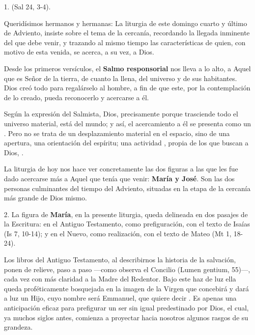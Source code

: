 				\begin{body}
					1.  (Sal 24, 3-4). 
					
					Queridísimos hermanos y hermanas: La liturgia de este domingo cuarto y último de Adviento, insiste sobre el tema de la cercanía, recordando la llegada inminente del que debe venir, y trazando al mismo tiempo las características de quien, con motivo de esta venida, se acerca, a su vez, a Dios.
					
					Desde los primeros versículos, el \textbf{Salmo responsorial} nos lleva a lo alto, a Aquel que es Señor de la tierra, de cuanto la llena, del universo y de sus habitantes. Dios creó todo para regalárselo al hombre, a fin de que este, por la contemplación de lo creado, pueda reconocerlo y acercarse a él.
					
					Según la expresión del Salmista, Dios, precisamente porque trasciende todo el universo material, está  del mundo; y así, el acercamiento a él se presenta como un . Pero no se trata de un desplazamiento material en el espacio, sino de una apertura, una orientación del espíritu; una actividad , propia de los que buscan a Dios, .
					
					La liturgia de hoy nos hace ver concretamente las dos figuras a las que les fue dado acercarse más a Aquel que tenía que venir: \textbf{María y José}. Son las dos personas culminantes del tiempo del Adviento, situadas en la etapa de la cercanía más grande de Dios mismo.
					
					2. La figura de \textbf{María}, en la presente liturgia, queda delineada en dos pasajes de la Escritura: en el Antiguo Testamento, como prefiguración, con el texto de Isaías (Is 7, 10-14); y en el Nuevo, como realización, con el texto de Mateo (Mt 1, 18-24).
					
					Los libros del Antiguo Testamento, al describirnos la historia de la salvación, ponen de relieve, paso a paso ---como observa el Concilio (Lumen gentium, 55)---, cada vez con más claridad a la Madre del Redentor. Bajo este haz de luz ella queda proféticamente bosquejada en la imagen de la Virgen que concebirá y dará a luz un Hijo, cuyo nombre será Emmanuel, que quiere decir . Es apenas una anticipación eficaz para prefigurar un ser sin igual predestinado por Dios, el cual, ya muchos siglos antes, comienza a proyectar hacia nosotros algunos rasgos de su grandeza.
					

\end{body}
